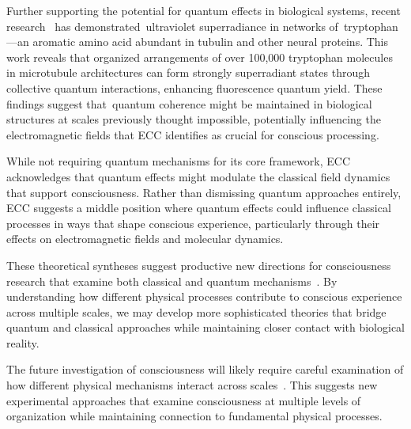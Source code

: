 Further supporting the potential for quantum effects in biological systems, recent research~\cite{Babcock2024} has demonstrated~ultraviolet superradiance in networks of~tryptophan—an aromatic amino acid abundant in tubulin and other neural proteins. This work reveals that organized arrangements of over 100,000 tryptophan molecules in microtubule architectures can form strongly superradiant states through collective quantum interactions, enhancing fluorescence quantum yield. These findings suggest that~quantum coherence might be maintained in biological structures at scales previously thought impossible, potentially influencing the electromagnetic fields that ECC identifies as crucial for conscious processing.

While not requiring quantum mechanisms for its core framework, ECC acknowledges that quantum effects might modulate the classical field dynamics that support consciousness. Rather than dismissing quantum approaches entirely, ECC suggests a middle position where quantum effects could influence classical processes in ways that shape conscious experience, particularly through their effects on electromagnetic fields and molecular dynamics.

These theoretical syntheses suggest productive new directions for consciousness research that examine both classical and quantum mechanisms~\cite{Hagan2002, hunt2024electromagnetic}. By understanding how different physical processes contribute to conscious experience across multiple scales, we may develop more sophisticated theories that bridge quantum and classical approaches while maintaining closer contact with biological reality.

The future investigation of consciousness will likely require careful examination of how different physical mechanisms interact across scales~\cite{Beck1992, seth2024conscious}. This suggests new experimental approaches that examine consciousness at multiple levels of organization while maintaining connection to fundamental physical processes.

